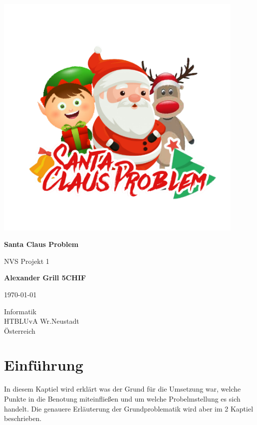 \documentclass[a4paper,12pt]{article}
\begin{document}
\begin{titlepage}
    \begin{center}
        \vspace*{1cm}
        \includegraphics[width=12cm]{Logo.png}
        
        \textbf{\huge Santa Claus Problem}
        
        \vspace{0.5cm}
        NVS Projekt 1
                 
        \vspace{1.0cm}
    
        \textbf{Alexander Grill 5CHIF}
        
        \today
        
        \vfill
                 
                 
        \vspace{0.5cm}
                 
        Informatik\\
        HTBLUvA Wr.Neustadt\\
        Österreich\\

                 
    \end{center}
\end{titlepage}  


\newpage
\tableofcontents
\newpage

\section{Einführung}
 In diesem Kaptiel wird erklärt was der Grund für die Umsetzung war, welche Punkte in die Benotung miteinfließen und um welche Probelmstellung es sich handelt. Die genauere Erläuterung
 der Grundproblematik wird aber im 2 Kaptiel beschrieben.
\end{document}
